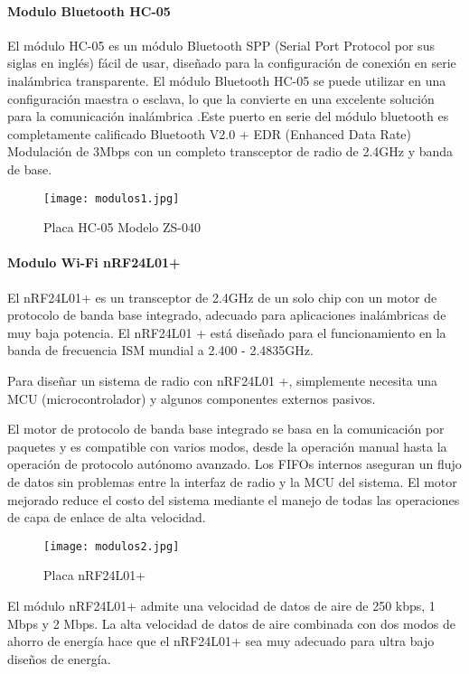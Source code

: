\paragraph{Modulo Bluetooth HC-05}
El módulo HC-05 es un módulo Bluetooth SPP (Serial Port Protocol por sus siglas en inglés) fácil de usar, diseñado para la configuración de conexión en serie inalámbrica transparente. El módulo Bluetooth HC-05 se puede utilizar en una configuración maestra o esclava, lo que la convierte en una excelente solución para la comunicación inalámbrica .Este puerto en serie del módulo bluetooth es completamente calificado Bluetooth V2.0 + EDR (Enhanced Data Rate) Modulación de 3Mbps con un completo transceptor de radio de 2.4GHz y banda de base\cite{bluetooth}.

\begin{figure}[H]
	\centering
	\texttt{[image: modulos1.jpg]}
	\caption{Placa HC-05 Modelo ZS-040}
\end{figure}

\paragraph{Modulo Wi-Fi nRF24L01+}
El nRF24L01+ es un transceptor de 2.4GHz de un solo chip con un motor de protocolo de banda base integrado, adecuado para aplicaciones inalámbricas de muy baja potencia. El nRF24L01 + está diseñado
para el funcionamiento en la banda de frecuencia ISM mundial a 2.400 - 2.4835GHz\cite{nrf}.

\par \noindent
Para diseñar un sistema de radio con nRF24L01 +, simplemente necesita una MCU (microcontrolador) y algunos componentes externos pasivos.

\par \noindent
El motor de protocolo de banda base integrado se basa en la comunicación por paquetes
y es compatible con varios modos, desde la operación manual hasta la operación de protocolo autónomo avanzado. 
Los FIFOs internos aseguran un flujo de datos sin problemas entre la interfaz de radio y la MCU del sistema. El motor mejorado reduce el costo del sistema mediante el manejo de todas las operaciones de capa de enlace de alta velocidad\cite{nrf}.

\begin{figure}[H]
	\centering
	\texttt{[image: modulos2.jpg]}
	\caption{Placa nRF24L01+}
\end{figure}

\par \noindent
El módulo nRF24L01+ admite una velocidad de datos de aire de 250 kbps, 1 Mbps y 2 Mbps.
La alta velocidad de datos de aire combinada con dos modos de ahorro de energía hace que el nRF24L01+ sea muy adecuado para ultra bajo
diseños de energía\cite{nrf}.

